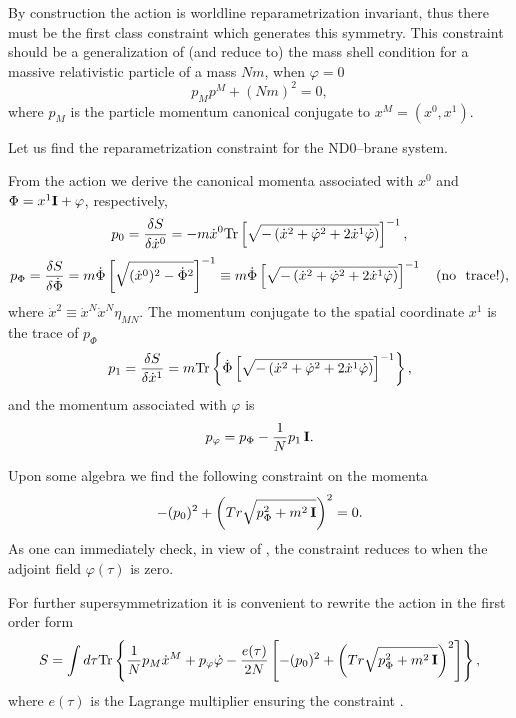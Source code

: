 \documentclass[a4paper,12pt]{article}
\begin{document}
By construction the action  is worldline reparametrization
invariant, thus there must be the first class constraint which
generates this symmetry. This constraint should be a
generalization of (and reduce to) the mass shell condition for a
massive relativistic particle of a mass $Nm$, when
$\varphi=0$
\begin{equation}\label{12}
p_Mp^M+(Nm)^2=0,
\end{equation}
where $p_M$ is the particle momentum canonical conjugate to
$x^M=(x^0,x^1)$.

Let us find the reparametrization constraint for the ND0--brane
system.

 From the action  we derive the canonical momenta associated
with $x^0$ and $\Phi=x^1 {\bf I}+\varphi$, respectively,
\begin{equation}\label{13}
p_0={{\delta S}\over{\delta \dot x^0}}=-m\dot x^0{\rm Tr}
\left[\sqrt{-\left(
\dot x^2+\dot\varphi^2 +
2\dot x^1 \dot\varphi\right)}\right]^{-1},
\end{equation}
\begin{equation}\label{14}
p_\Phi={{\delta S}\over{\delta \dot
\Phi}}=m\dot\Phi\left[\sqrt{
(\dot x^0)^2-\dot\Phi^2 }
\right]^{-1}\equiv m\dot\Phi\left[\sqrt{-\left(
\dot x^2+\dot\varphi^2 +
2\dot x^1 \dot\varphi\right)}
\right]^{-1} \quad {\rm (no ~~trace!)},
\end{equation}
where $\dot x^2\equiv \dot x^N\dot x^N\eta_{MN}$. The momentum
conjugate to the spatial coordinate $x^1$ is the trace of
$p_\Phi$
\begin{equation}\label{15}
p_1= {{\delta S}\over{\delta \dot x^1}}=m {\rm
Tr}\left\{\dot\Phi\left[\sqrt{-\left(
\dot x^2+\dot\varphi^2 +
2\dot x^1 \dot\varphi\right)}
\right]^{-1}\right\},
\end{equation}
and the momentum associated with $\varphi$ is
\begin{equation}\label{16}
p_\varphi=p_\Phi-{1\over N}p_1\,{\bf I}.
\end{equation}

Upon some algebra we find the following constraint on the momenta
\begin{equation}\label{17}
-(p_0)^2+\left(Tr\sqrt{p_\Phi^2+m^2\,{\bf I}}\right)^2=0.
\end{equation}
As one can immediately check, in view of , the constraint
 reduces to  when the adjoint field
$\varphi(\tau)$ is zero.

For further supersymmetrization it is convenient to rewrite the
action  in the first order form
\begin{equation}\label{18}
S=\int d\tau {\rm Tr}\left\{{1\over N}p_M\dot
x^M+p_\varphi\dot\varphi-{{e(\tau)}\over
2N}\left[-(p_0)^2+\left(Tr\sqrt{p_\Phi^2+m^2\,{\bf
I}}\right)^2\right]\right\},
\end{equation}
where $e(\tau)$ is the Lagrange multiplier ensuring the
constraint .
\end{document}
